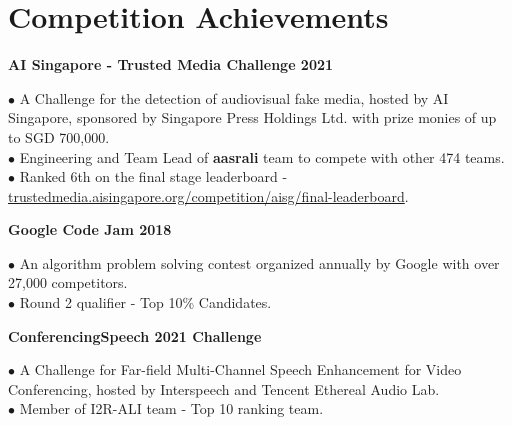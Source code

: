 \documentclass[10pt]{article}
\begin{document}
    \section{Competition Achievements}
        \begin{flushleft}
            \textbf{AI Singapore - Trusted Media Challenge 2021}
        \end{flushleft}
        \vspace{-1.5mm}
        $\bullet$ A Challenge for the detection of audiovisual fake media, hosted by AI Singapore, sponsored by Singapore Press Holdings Ltd. with prize monies of up to SGD 700,000. \\
        $\bullet$ Engineering and Team Lead of \textbf{aasrali} team to compete with other 474 teams. \\
        $\bullet$ Ranked 6th on the final stage leaderboard - \href{https://trustedmedia.aisingapore.org/competition/aisg/final-leaderboard/}{trustedmedia.aisingapore.org/competition/aisg/final-leaderboard}. \\

        \begin{flushleft}
            \textbf{Google Code Jam 2018}
        \end{flushleft}
        \vspace{-1.5mm}
        $\bullet$ An algorithm problem solving contest organized annually by Google with over 27,000 competitors. \\
        $\bullet$ Round 2 qualifier - Top 10\% Candidates. \\

        \begin{flushleft}
            \textbf{ConferencingSpeech 2021 Challenge}
        \end{flushleft}
        \vspace{-1.5mm}
        $\bullet$ A Challenge for Far-field Multi-Channel Speech Enhancement for Video Conferencing, hosted by Interspeech and Tencent Ethereal Audio Lab. \\
        $\bullet$ Member of I2R-ALI team - Top 10 ranking team. \\


    \vspace{2mm}
\end{document}
